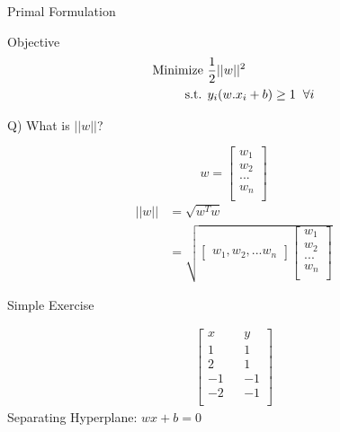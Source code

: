 \documentclass{beamer}
\begin{document}
\begin{frame}{Primal Formulation}
	\begin{tcolorbox}{Objective}
	\begin{align*}
	\text{Minimize } & \frac{1}{2}||w||^{2} \\
	\text{s.t. } & y_{i}(w.x_{i} + b) \geq 1 \hspace{2mm}\forall i
	\end{align*}
\end{tcolorbox}
\pause 
Q) What is $||w||$?
\pause
\begin{multicols}{2}
\begin{equation*}
	 w = \begin{bmatrix}
	 w_{1} \\
     w_{2} \\
     ...  \\
     w_{n} \\
	\end{bmatrix}
\end{equation*}\break
\begin{align*}
	 ||w|| &= \sqrt{w^{T}w}\\
	 &= \sqrt{\begin{bmatrix}
	 w_{1}, w_{2}, ... w_{n}
	 \end{bmatrix}
	 \begin{bmatrix}
	  w_{1} \\
	  w_{2} \\
     ...  \\
     w_{n} \\
	 \end{bmatrix}}
\end{align*}

\end{multicols}

\end{frame}

{
	
}



\begin{frame}{Simple Exercise}

\begin{align*}
\begin{bmatrix}
x && y \\
1 && 1\\
2 && 1\\
-1 && -1\\
-2 && -1\\
\end{bmatrix}
\end{align*}
Separating Hyperplane: $wx + b = 0$
\end{frame}
\end{document}
